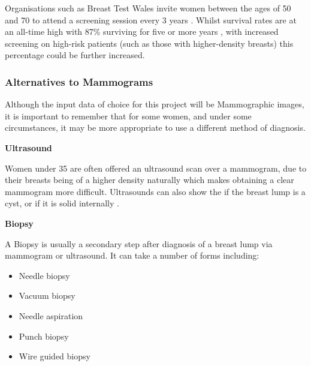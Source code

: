 \vspace{-0.75cm}

Organisations such as Breast Test Wales invite women between the ages of 50 and 70 to attend a screening session every 3 years \cite{Informed_Choice_about_Cancer_Screening_2013}. Whilst survival rates are at an all-time high with 87\% surviving for five or more years \cite{Breast_cancer_statistics_2015}, with increased screening on high-risk patients (such as those with higher-density breasts) this percentage could be further increased.

\vspace{-0.5cm}

\subsubsection{Alternatives to Mammograms}

Although the input data of choice for this project will be Mammographic images, it is important to remember that for some women, and under some circumstances, it may be more appropriate to use a different method of diagnosis.

\noindent \textbf{Ultrasound}

Women under 35 are often offered an ultrasound scan over a mammogram, due to their breasts being of a higher density naturally which makes obtaining a clear mammogram more difficult. Ultrasounds can also show the if the breast lump is a cyst, or if it is solid internally \cite{Cancer_Research_UK_2015}.

\noindent \textbf{Biopsy}

A Biopsy is usually a secondary step after diagnosis of a breast lump via mammogram or ultrasound. It can take a number of forms including:

\begin{itemize}
  \item Needle biopsy
  \item Vacuum biopsy
  \item Needle aspiration
  \item Punch biopsy
  \item Wire guided biopsy
\end{itemize}
